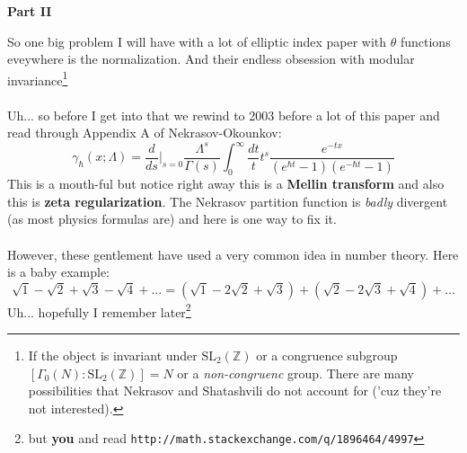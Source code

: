 \documentclass[12pt]{article}
\begin{document}
\noindent \textbf{Part II}

\noindent So one big problem I will have with a lot of elliptic index paper with $\theta$ functions eveywhere is the normalization.  And their endless obsession with modular invariance\footnote{If the object is invariant under $\text{SL}_2(\mathbb{Z})$ or a congruence subgroup $[ \Gamma_0(N) : \text{SL}_2(\mathbb{Z})] = N$ or a \textit{non-congruenc} group.  There are many possibilities that Nekrasov and Shatashvili do not account for ('cuz they're not interested).} \\ \\
Uh... so before I get into that we rewind to 2003 before a lot of this paper and read through Appendix A of Nekrasov-Okounkov:
$$ \gamma_{\hbar}(x; \Lambda)
= \frac{d}{ds}\bigg|_{s=0} \frac{\Lambda^s}{\Gamma(s)} \int_0^\infty \frac{dt}{t} t^s \frac{e^{-tx}}{(e^{\hbar t}-1)(e^{-\hbar t}-1)} $$
This is a mouth-ful but notice right away this is a \textbf{Mellin transform} and also this is \textbf{zeta regularization}. The Nekrasov partition function is \textit{badly} divergent (as most physics formulas are) and here is one way to fix it.\\ \\
However, these gentlement have used a very common idea in number theory.  Here is a baby example:
$$ \sqrt{1} -\sqrt{2} + \sqrt{3} - \sqrt{4} + \dots = (\sqrt{1} -2\sqrt{2} + \sqrt{3}) + (\sqrt{2} -2\sqrt{3} + \sqrt{4}) + \dots $$
Uh... hopefully I remember later\footnote{but \textbf{you} and read \texttt{http://math.stackexchange.com/q/1896464/4997}}
  

\newpage
\end{document}
